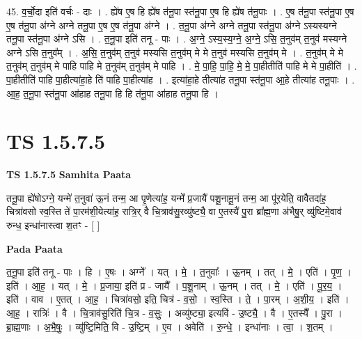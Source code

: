 \documentclass[17pt]{extarticle}
\begin{document}
45. व॒र्चो॒दा इति॑ वर्चः - दाः । . ह्ये॑ष ए॒ष हि ह्ये॑ष त॑नू॒पा स्त॑नू॒पा ए॒ष हि ह्ये॑ष त॑नू॒पाः । . ए॒ष त॑नू॒पा स्त॑नू॒पा ए॒ष ए॒ष त॑नू॒पा अ॑ग्ने अग्ने तनू॒पा ए॒ष ए॒ष त॑नू॒पा अ॑ग्ने । . त॒नू॒पा अ॑ग्ने अग्ने तनू॒पा स्त॑नू॒पा अ॑ग्ने ऽस्यस्यग्ने तनू॒पा स्त॑नू॒पा अ॑ग्ने ऽसि । . त॒नू॒पा इति॑ तनू - पाः । . अ॒ग्ने॒ ऽस्य॒स्य॒ग्ने॒ अ॒ग्ने॒ ऽसि॒ त॒नुव॑म् त॒नुव॑ मस्यग्ने अग्ने ऽसि त॒नुव᳚म् । . अ॒सि॒ त॒नुव॑म् त॒नुव॑ मस्यसि त॒नुव॑म् मे मे त॒नुव॑ मस्यसि त॒नुव॑म् मे । . त॒नुव॑म् मे मे त॒नुव॑म् त॒नुव॑म् मे पाहि पाहि मे त॒नुव॑म् त॒नुव॑म् मे पाहि । . मे॒ पा॒हि॒ पा॒हि॒ मे॒ मे॒ पा॒हीतीति॑ पाहि मे मे पा॒हीति॑ । . पा॒हीतीति॑ पाहि पा॒हीत्या॑हा॒हे ति॑ पाहि पा॒हीत्या॑ह । . इत्या॑हा॒हे तीत्या॑ह तनू॒पा स्त॑नू॒पा आ॒हे तीत्या॑ह तनू॒पाः । . आ॒ह॒ त॒नू॒पा स्त॑नू॒पा आ॑हाह तनू॒पा हि हि त॑नू॒पा आ॑हाह तनू॒पा हि । \newline
\pagebreak
{}

\section{ TS 1.5.7.5 }

\textbf{TS 1.5.7.5 } \newline
\textbf{Samhita Paata} \newline

तनू॒पा ह्ये॑षोऽग्ने॒ यन्मे॑ त॒नुवा॑ ऊ॒नं तन्म॒ आ पृ॒णेत्या॑ह॒ यन्मे᳚ प्र॒जायै॑ पशू॒नामू॒नं तन्म॒ आ पू॑र॒येति॒ वावैतदा॑ह॒ चित्रा॑वसो स्व॒स्ति ते॑ पा॒रम॑शी॒येत्या॑ह॒ रात्रि॒र् वै चि॒त्राव॑सु॒रव्यु॑ष्ट्यै॒ वा ए॒तस्यै॑ पु॒रा ब्रा᳚ह्म॒णा अ॑भैषु॒र् व्यु॑ष्टिमे॒वाव॑ रुन्ध॒ इन्धा॑नास्त्वा श॒तꣳ - [ ] \newline

\textbf{Pada Paata} \newline

त॒नू॒पा इति॑ तनू - पाः । हि । ए॒षः । अग्ने᳚ । यत् । मे॒ । त॒नुवाः᳚ । ऊ॒नम् । तत् । मे॒ । एति॑ । पृ॒ण॒ । इति॑ । आ॒ह॒ । यत् । मे॒ । प्र॒जाया॒ इति॑ प्र - जायै᳚ । प॒शू॒नाम् । ऊ॒नम् । तत् । मे॒ । एति॑ । पू॒र॒य॒ । इति॑ । वाव । ए॒तत् । आ॒ह॒ । चित्रा॑वसो॒ इति॒ चित्र॑ - व॒सो॒ । स्व॒स्ति । ते॒ । पा॒रम् । अ॒शी॒य॒ । इति॑ । आ॒ह॒ । रात्रिः॑ । वै । चि॒त्राव॑सु॒रिति॑ चि॒त्र - व॒सुः॒ । अव्यु॑ष्ट्या॒ इत्यवि॑ - उ॒ष्ट्यै॒ । वै । ए॒तस्यै᳚ । पु॒रा । ब्रा॒ह्म॒णाः । अ॒भै॒षुः॒ । व्यु॑ष्टि॒मिति॒ वि - उ॒ष्टि॒म् । ए॒व । अवेति॑ । रु॒न्धे॒ । इन्धा॑नाः । त्वा॒ । श॒तम् ।  \newline
\end{document}
